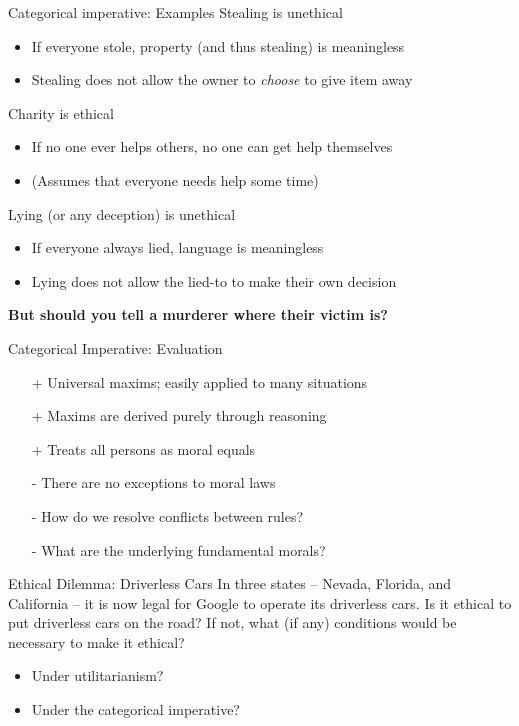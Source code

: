 \documentclass{beamer}
\begin{document}
\begin{frame}{Categorical imperative: Examples}
Stealing is unethical
\begin{itemize}
\item If everyone stole, property (and thus stealing) is meaningless
\item Stealing does not allow the owner to \emph{choose} to give item away
\end{itemize}
\medskip
\pause
Charity is ethical
\begin{itemize}
\item If no one ever helps others, no one can get help themselves
\item (Assumes that everyone needs help some time)
\end{itemize}
\medskip
\pause
Lying (or any deception) is unethical
\begin{itemize}
\item If everyone always lied, language is meaningless
\item Lying does not allow the lied-to to make their own decision
\end{itemize}
\pause
\medskip
\textbf{But should you tell a murderer where their victim is?}
\end{frame}

\begin{frame}{Categorical Imperative: Evaluation}
\begin{itemize}
\item[+] Universal maxims; easily applied to many situations
\item[+] Maxims are derived purely through reasoning
\item[+] Treats all persons as moral equals
\item[-] There are no exceptions to moral laws
\item[-] How do we resolve conflicts between rules?
\item[-] What are the underlying fundamental morals?
\end{itemize}
\end{frame}

\begin{frame}{Ethical Dilemma: Driverless Cars}
In three states -- Nevada, Florida, and California -- it is now legal for Google to operate its driverless cars. Is it ethical to put driverless cars on the road? If not, what (if any) conditions would be necessary to make it ethical?
\bigskip
\begin{itemize}
\item Under utilitarianism?
\item Under the categorical imperative?
\end{itemize}
\end{frame}
\end{document}
